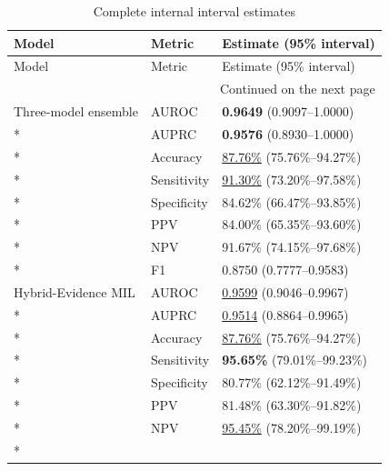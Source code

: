 \begingroup\footnotesize
\renewcommand{\arraystretch}{1.12}
\begin{longtable}{@{}p{}p{}p{}@{}}
\caption{Complete internal interval estimates}\label{tab:S2}\\
\toprule Model & Metric & Estimate (95\% interval) \\ \midrule\endfirsthead
\toprule Model & Metric & Estimate (95\% interval) \\ \midrule\endhead
\midrule\multicolumn{3}{r}{Continued on the next page}\\\endfoot\bottomrule\endlastfoot

Three-model ensemble & AUROC & \textbf{0.9649} (0.9097--1.0000) \\*

 & AUPRC & \textbf{0.9576} (0.8930--1.0000) \\*

 & Accuracy & \underline{87.76\%} (75.76\%--94.27\%) \\*

 & Sensitivity & \underline{91.30\%} (73.20\%--97.58\%) \\*

 & Specificity & 84.62\% (66.47\%--93.85\%) \\*

 & PPV & 84.00\% (65.35\%--93.60\%) \\*

 & NPV & 91.67\% (74.15\%--97.68\%) \\*

 & F1 & 0.8750 (0.7777--0.9583) \\

\addlinespace

Hybrid-Evidence MIL & AUROC & \underline{0.9599} (0.9046--0.9967) \\*

 & AUPRC & \underline{0.9514} (0.8864--0.9965) \\*

 & Accuracy & \underline{87.76\%} (75.76\%--94.27\%) \\*

 & Sensitivity & \textbf{95.65\%} (79.01\%--99.23\%) \\*

 & Specificity & 80.77\% (62.12\%--91.49\%) \\*

 & PPV & 81.48\% (63.30\%--91.82\%) \\*

 & NPV & \underline{95.45\%} (78.20\%--99.19\%) \\*


\end{longtable}
